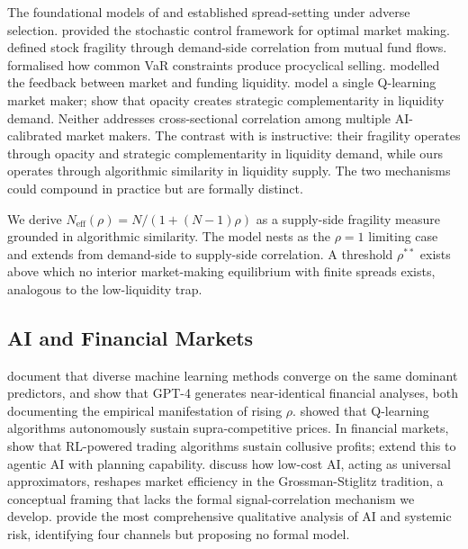 The foundational models of \citet{glosten1985} and \citet{kyle1985} established spread-setting under adverse selection. \citet{avellaneda2008} provided the stochastic control framework for optimal market making. \citet{greenwood2011} defined stock fragility through demand-side correlation from mutual fund flows. \citet{danielsson2012} formalised how common VaR constraints produce procyclical selling. \citet{brunnermeier2009} modelled the feedback between market and funding liquidity. \citet{colliard2025} model a single Q-learning market maker; \citet{cespa2025} show that opacity creates strategic complementarity in liquidity demand. Neither addresses cross-sectional correlation among multiple AI-calibrated market makers. The contrast with \citet{cespa2025} is instructive: their fragility operates through opacity and strategic complementarity in liquidity demand, while ours operates through algorithmic similarity in liquidity supply. The two mechanisms could compound in practice but are formally distinct.

We derive $N_{\text{eff}}(\rho) = N/(1+(N-1)\rho)$ as a supply-side fragility measure grounded in algorithmic similarity. The model nests \citet{danielsson2012} as the $\rho = 1$ limiting case and extends \citet{greenwood2011} from demand-side to supply-side correlation. A threshold $\rho^{**}$ exists above which no interior market-making equilibrium with finite spreads exists, analogous to the \citet{pagano1989} low-liquidity trap.

\subsection{AI and Financial Markets}

\citet{gu2020} document that diverse machine learning methods converge on the same dominant predictors, and \citet{kim2024} show that GPT-4 generates near-identical financial analyses, both documenting the empirical manifestation of rising $\rho$. \citet{calvano2020} showed that Q-learning algorithms autonomously sustain supra-competitive prices. In financial markets, \citet{dou2025a} show that RL-powered trading algorithms sustain collusive profits; \citet{dou2025b} extend this to agentic AI with planning capability. \citet{barucca2025} discuss how low-cost AI, acting as universal approximators, reshapes market efficiency in the Grossman-Stiglitz tradition, a conceptual framing that lacks the formal signal-correlation mechanism we develop. \citet{danielsson2022} provide the most comprehensive qualitative analysis of AI and systemic risk, identifying four channels but proposing no formal model.

